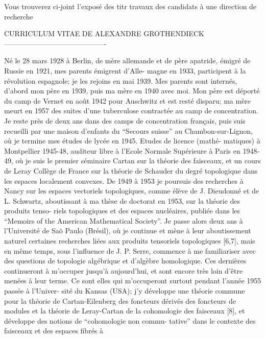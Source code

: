 Vous trouverez ci-joint l'exposé
des titr travaux des candidats
à une direction de recherche

CURRICULUM VITAE DE ALEXANDRE GROTHENDIECK
-------------------------------------------

Né le 28 mars 1928 à Berlin, de mère allemande et de père
apatride, émigré de Russie en 1921, mes parents émigrent d'Alle-%
magne en 1933, participent à la révolution espagnole; je les
rejoins en mai 1939. Mes parents sont internés, d'abord mon père
en 1939, puis ma mère en 1940 avec moi. Mon père est déporté du
camp de Vernet en août 1942 pour Auschwitz et est resté disparu;
ma mère meurt en 1957 des suites d'une tuberculose contractée au
camp de concentration. Je reste près de deux ans dans des camps
de concentration français, puis suis recueilli par une maison
d'enfants du ``Secours suisse'' au Chambon-sur-Lignon, où je
termine mes études de lycée en 1945. Etudes de licence (mathé-%
matiques) à Montpellier 1945-48, auditeur libre à l'Ecole Normale
Supérieure à Paris en 1948-49, où je suis le premier séminaire
Cartan sur la théorie des faisceaux, et un cours de Leray 
Collège de France sur la théorie de Schauder du degré topologique
dans les espaces localement convexes. De 1949 à 1953 je poursuis
des recherches à Nancy sur les espaces vectoriels topologiques,
comme élève de J. Dieudonné et de L. Schwartz, aboutissant à ma
thèse de doctorat en 1953, sur la théorie des produits tenso-%
riels topologiques et des espaces nucléaires, publiée dans les
``Memoirs of the American Mathematical Society''. Je passe alors
deux ans à l'Université de Saõ Paulo (Brésil), où je continue
et mène à leur aboutissement naturel certaines recherches liées
aux produits tensoriels topologiques [6,7], mais en même temps,
sous l'influence de J. P. Serre, commence à me familiariser avec
des questions de topologie algébrique et d'algèbre homologique.
Ces dernières continueront à m'occuper jusqu'à aujourd'hui, et
sont encore très loin d'être menées à leur terme. Ce sont elles
qui m'occuperont surtout pendant l'année 1955 passée à l'Univer-%
sité du Kansas (USA); j'y développe une théorie commune pour la
théorie de Cartan-Eilenberg des foncteurs dérivés des foncteurs
de modules et la théorie de Leray-Cartan de la cohomologie des
faisceaux [8], et développe des notions de ``cohomologie non commu-%
tative'' dans le contexte des faisceaux et des espaces fibrés à

